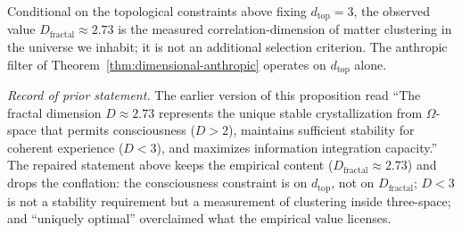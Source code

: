 \begin{prop}\label{prop:optimal-dimension}
Conditional on the topological constraints above fixing $d_{\text{top}} = 3$,
the observed value $D_{\text{fractal}} \approx 2.73$ is the measured
correlation-dimension of matter clustering in the universe we inhabit; it is
not an additional selection criterion. The anthropic filter of
Theorem~\ref{thm:dimensional-anthropic} operates on $d_{\text{top}}$ alone.

\emph{Record of prior statement.} The earlier version of this proposition read
``The fractal dimension $D \approx 2.73$ represents the unique stable
crystallization from $\Omega$-space that permits consciousness ($D > 2$),
maintains sufficient stability for coherent experience ($D < 3$), and
maximizes information integration capacity.'' The repaired statement above
keeps the empirical content ($D_{\text{fractal}} \approx 2.73$) and drops the
conflation: the consciousness constraint is on $d_{\text{top}}$, not on
$D_{\text{fractal}}$; $D < 3$ is not a stability requirement but a measurement
of clustering inside three-space; and ``uniquely optimal'' overclaimed what
the empirical value licenses.
\end{prop}


